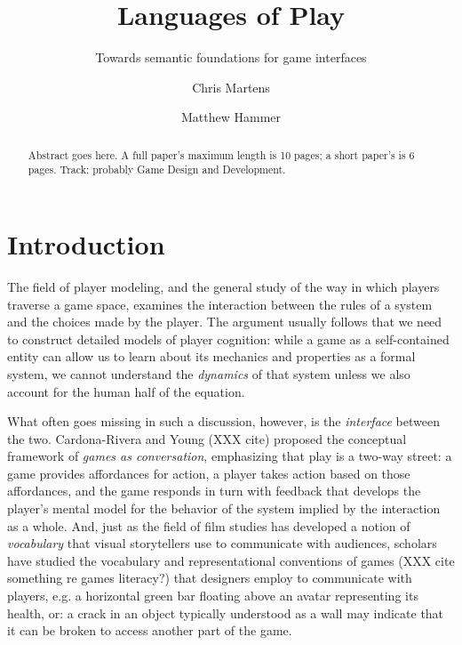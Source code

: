 \documentclass[sigconf]{acmart}
\begin{document}
\title{Languages of Play}
\subtitle{Towards semantic foundations for game interfaces}


\author{Chris Martens}

\author{Matthew Hammer}


\begin{abstract}
Abstract goes here. A full paper's maximum length is 10 pages; a short
paper's is 6 pages. Track: probably Game Design and Development.
\end{abstract}



\maketitle

\section{Introduction}

The field of player modeling, and the general study of the way in which
players traverse a game space, examines the interaction between the rules
of a system and the choices made by the player. The argument usually
follows that we need to construct detailed models of player cognition: 
while a game as a self-contained entity can allow us to learn about its
mechanics and properties as a formal system, we cannot understand the {\em
dynamics} of that system unless we also account for the human half of the
equation.

What often goes missing in such a discussion, however, is the {\em
interface} between the two. Cardona-Rivera and Young (XXX cite) proposed
the conceptual framework of {\em games as conversation}, emphasizing that
play is a two-way street: a game provides affordances for action, a player
takes action based on those affordances, and the game responds in turn with
feedback that develops the player's mental model for the behavior
of the system implied by the interaction as a whole. And, just as the field
of film studies has developed a notion of {\em vocabulary} that visual
storytellers use to communicate with audiences, scholars have studied the
vocabulary and representational conventions of games (XXX cite something re
games literacy?) that designers employ to communicate with players, e.g. a
horizontal green bar floating above an avatar representing its health, or:
a crack in an object typically understood as a wall may indicate that it
can be broken to access another part of the game.
\end{document}
